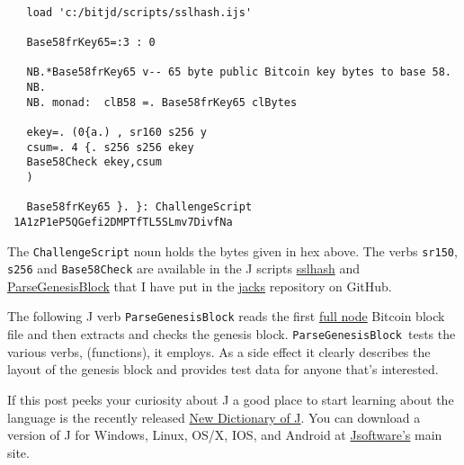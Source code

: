 \begin{tcolorbox}[breakable, size=fbox, boxrule=1pt, pad at break*=1mm,colback=cellbackground, colframe=cellborder]
\begin{lstlisting}[language=jdoc, frame=single,framerule=0pt,label=lst:scr4754X0e]

   load 'c:/bitjd/scripts/sslhash.ijs'

   Base58frKey65=:3 : 0

   NB.*Base58frKey65 v-- 65 byte public Bitcoin key bytes to base 58.
   NB.
   NB. monad:  clB58 =. Base58frKey65 clBytes

   ekey=. (0{a.) , sr160 s256 y
   csum=. 4 {. s256 s256 ekey
   Base58Check ekey,csum
   )

   Base58frKey65 }. }: ChallengeScript
 1A1zP1eP5QGefi2DMPTfTL5SLmv7DivfNa
\end{lstlisting}
\end{tcolorbox}

The \texttt{ChallengeScript} noun holds the bytes given in hex above.
The verbs \texttt{sr150}, \texttt{s256} and \texttt{Base58Check} are
available in the J scripts
\href{https://github.com/bakerjd99/jacks/blob/master/bitcoin/sslhash.ijs}{sslhash}
and
\href{https://github.com/bakerjd99/jacks/blob/master/bitcoin/ParseGenesisBlock.ijs}{ParseGenesisBlock}
that I have put in the \href{https://github.com/bakerjd99/jacks}{jacks}
repository on GitHub.

The following J verb \texttt{ParseGenesisBlock} reads the first
\href{https://bitcoin.org/en/download}{full node} Bitcoin block file and
then extracts and checks the genesis block.
\texttt{ParseGenesisBlock}~tests the various verbs, (functions), it
employs. As a side effect it clearly describes the layout of the genesis
block and provides test data for anyone that's interested.

If this post peeks your curiosity about J a good place to start learning
about the language is the recently released
\href{http://www.jsoftware.com/jwiki/Vocabulary/HowNuVoc}{New Dictionary
of J}. You can download a version of J for Windows, Linux, OS/X, IOS,
and Android at \href{http://www.jsoftware.com/}{Jsoftware's} main site.



